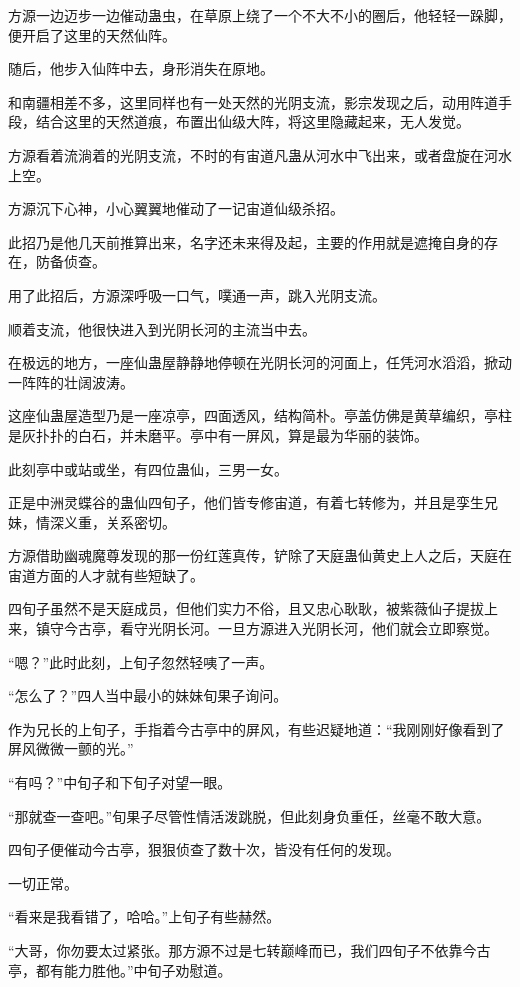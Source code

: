 \begin{this_body}
方源一边迈步一边催动蛊虫，在草原上绕了一个不大不小的圈后，他轻轻一跺脚，便开启了这里的天然仙阵。

随后，他步入仙阵中去，身形消失在原地。

和南疆相差不多，这里同样也有一处天然的光阴支流，影宗发现之后，动用阵道手段，结合这里的天然道痕，布置出仙级大阵，将这里隐藏起来，无人发觉。

方源看着流淌着的光阴支流，不时的有宙道凡蛊从河水中飞出来，或者盘旋在河水上空。

方源沉下心神，小心翼翼地催动了一记宙道仙级杀招。

此招乃是他几天前推算出来，名字还未来得及起，主要的作用就是遮掩自身的存在，防备侦查。

用了此招后，方源深呼吸一口气，噗通一声，跳入光阴支流。

顺着支流，他很快进入到光阴长河的主流当中去。

在极远的地方，一座仙蛊屋静静地停顿在光阴长河的河面上，任凭河水滔滔，掀动一阵阵的壮阔波涛。

这座仙蛊屋造型乃是一座凉亭，四面透风，结构简朴。亭盖仿佛是黄草编织，亭柱是灰扑扑的白石，并未磨平。亭中有一屏风，算是最为华丽的装饰。

此刻亭中或站或坐，有四位蛊仙，三男一女。

正是中洲灵蝶谷的蛊仙四旬子，他们皆专修宙道，有着七转修为，并且是孪生兄妹，情深义重，关系密切。

方源借助幽魂魔尊发现的那一份红莲真传，铲除了天庭蛊仙黄史上人之后，天庭在宙道方面的人才就有些短缺了。

四旬子虽然不是天庭成员，但他们实力不俗，且又忠心耿耿，被紫薇仙子提拔上来，镇守今古亭，看守光阴长河。一旦方源进入光阴长河，他们就会立即察觉。

“嗯？”此时此刻，上旬子忽然轻咦了一声。

“怎么了？”四人当中最小的妹妹旬果子询问。

作为兄长的上旬子，手指着今古亭中的屏风，有些迟疑地道：“我刚刚好像看到了屏风微微一颤的光。”

“有吗？”中旬子和下旬子对望一眼。

“那就查一查吧。”旬果子尽管性情活泼跳脱，但此刻身负重任，丝毫不敢大意。

四旬子便催动今古亭，狠狠侦查了数十次，皆没有任何的发现。

一切正常。

“看来是我看错了，哈哈。”上旬子有些赫然。

“大哥，你勿要太过紧张。那方源不过是七转巅峰而已，我们四旬子不依靠今古亭，都有能力胜他。”中旬子劝慰道。


\end{this_body}
